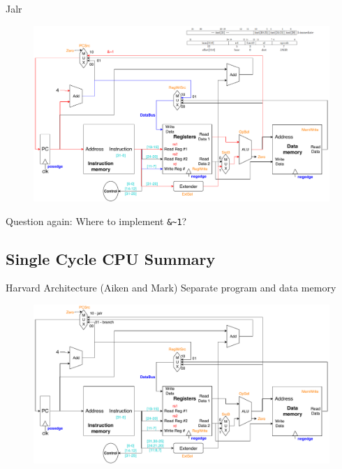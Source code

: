 \documentclass{myslide}
\begin{document}
\begin{frame}[fragile]{Jalr}
\begin{figure}
\centering
\includegraphics[width=0.8\linewidth]{fig/Lecture2/Datapath-jalr.pdf}
\end{figure}
Question again: Where to implement \verb'&~1'?
\end{frame}

\subsection{Single Cycle CPU Summary}
\begin{frame}
\subsectionpage
\end{frame}

\begin{frame}{Harvard Architecture (Aiken and Mark)}
Separate program and data memory
\begin{figure}
\centering
\includegraphics[width=\linewidth]{fig/Lecture2/Datapath-All.pdf}
\end{figure}
\end{frame}
\end{document}
